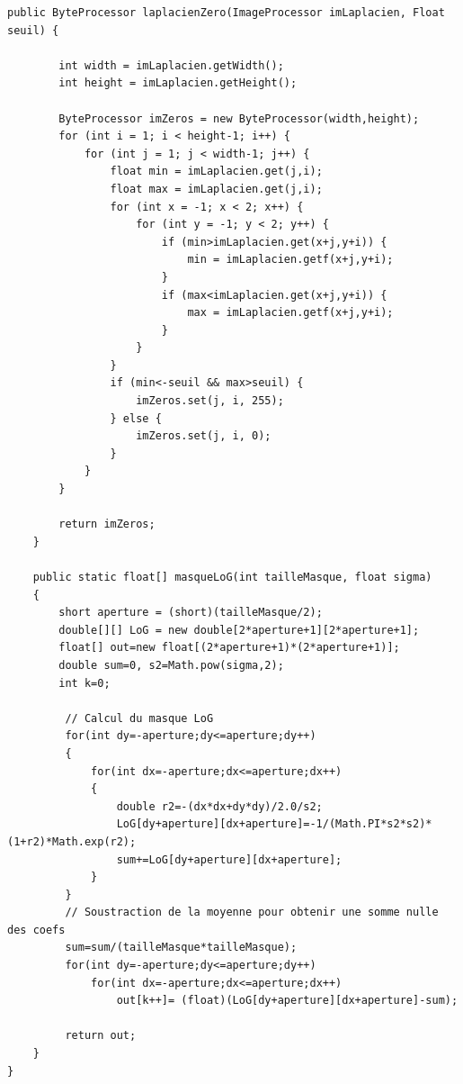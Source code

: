 \documentclass[a4paper,12pt]{report}
\begin{document}
\begin{lstlisting}[style=Java]
	public ByteProcessor laplacienZero(ImageProcessor imLaplacien, Float seuil) {
		
		int width = imLaplacien.getWidth();
		int height = imLaplacien.getHeight();
		
		ByteProcessor imZeros = new ByteProcessor(width,height);
		for (int i = 1; i < height-1; i++) {
			for (int j = 1; j < width-1; j++) {
				float min = imLaplacien.get(j,i);
				float max = imLaplacien.get(j,i);
				for (int x = -1; x < 2; x++) {
					for (int y = -1; y < 2; y++) {
						if (min>imLaplacien.get(x+j,y+i)) {
							min = imLaplacien.getf(x+j,y+i);
						}
						if (max<imLaplacien.get(x+j,y+i)) {
							max = imLaplacien.getf(x+j,y+i);
						}
					}
				}
				if (min<-seuil && max>seuil) {
					imZeros.set(j, i, 255);
				} else {
					imZeros.set(j, i, 0);					
				}
			}
		}	
		
		return imZeros;
	}

    public static float[] masqueLoG(int tailleMasque, float sigma)
    {     
		short aperture = (short)(tailleMasque/2);
		double[][] LoG = new double[2*aperture+1][2*aperture+1];
		float[] out=new float[(2*aperture+1)*(2*aperture+1)];
		double sum=0, s2=Math.pow(sigma,2);
		int k=0;

		 // Calcul du masque LoG
		 for(int dy=-aperture;dy<=aperture;dy++)
		 {
			 for(int dx=-aperture;dx<=aperture;dx++)
			 {
				 double r2=-(dx*dx+dy*dy)/2.0/s2;
				 LoG[dy+aperture][dx+aperture]=-1/(Math.PI*s2*s2)*(1+r2)*Math.exp(r2);
				 sum+=LoG[dy+aperture][dx+aperture];
			 }
		 }
		 // Soustraction de la moyenne pour obtenir une somme nulle des coefs
		 sum=sum/(tailleMasque*tailleMasque);
		 for(int dy=-aperture;dy<=aperture;dy++)
			 for(int dx=-aperture;dx<=aperture;dx++)
				 out[k++]= (float)(LoG[dy+aperture][dx+aperture]-sum);
		 
		 return out;
    }
}
\end{lstlisting}
\end{document}
